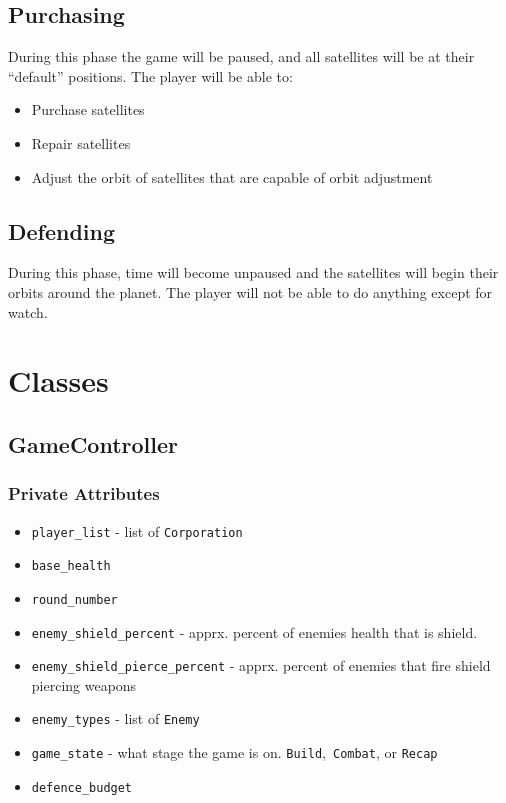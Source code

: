 \documentclass[12pt]{article}
\begin{document}
\subsection*{Purchasing}
During this phase the game will be paused, and all satellites will be at their ``default''
positions. The player will be able to:
\begin{itemize}
\item Purchase satellites
\item Repair satellites
\item Adjust the orbit of satellites that are capable of orbit adjustment
\end{itemize}
\subsection*{Defending}
During this phase, time will become unpaused and the satellites will begin their orbits
around the planet. The player will not be able to do anything except for watch.

\section*{Classes}

\subsection*{GameController}
\subsubsection*{Private Attributes}
\begin{itemize}
\item \texttt{player\_list} - list of \texttt{Corporation}
\item \texttt{base\_health}
\item \texttt{round\_number}
\item \texttt{enemy\_shield\_percent} - apprx. percent of enemies health that is
shield.
\item \texttt{enemy\_shield\_pierce\_percent} - apprx. percent of enemies that
fire shield piercing weapons
\item \texttt{enemy\_types} - list of \texttt{Enemy}
\item \texttt{game\_state} - what stage the game is on. \texttt{Build},\
\texttt{Combat}, or \texttt{Recap}
\item \texttt{defence\_budget}
\end{itemize}
\end{document}
